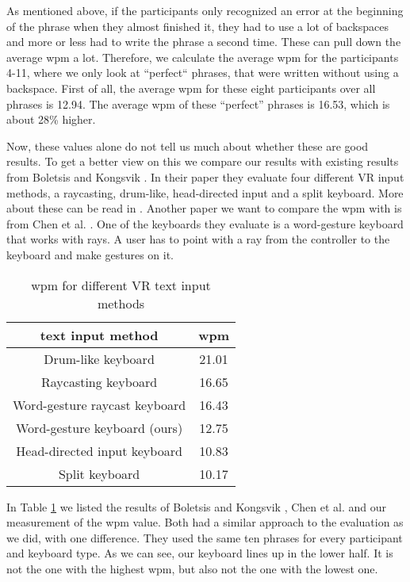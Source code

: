 As mentioned above, if the participants only recognized an error at the beginning of the phrase when they almost finished it, they had to use a lot of backspaces and more or less had to write the phrase a second time. These can pull down the average wpm a lot. Therefore, we calculate the average wpm for the participants 4-11, where we only look at ``perfect`` phrases, that were written without using a backspace. First of all, the average wpm for these eight participants over all phrases is 12.94. The average wpm of these ``perfect'' phrases is 16.53, which is about 28\% higher.

Now, these values alone do not tell us much about whether these are good results. To get a better view on this we compare our results with existing results from Boletsis and Kongsvik \cite{Boletsis2019ControllerbasedTT}. In their paper they evaluate four different VR input methods, a raycasting, drum-like, head-directed input and a split keyboard. More about these can be read in . Another paper we want to compare the wpm with is from Chen et al. \cite{10.1145/3290607.3312762}. One of the keyboards they evaluate is a word-gesture keyboard that works with rays. A user has to point with a ray from the controller to the keyboard and make gestures on it.
\begin{table}[ht!]
    \centering
    \caption{wpm for different VR text input methods}
    \begin{tabular}{cc} \toprule
        text input method&wpm\\ \midrule
        Drum-like keyboard& 21.01\\
        Raycasting keyboard& 16.65\\
        Word-gesture raycast keyboard& 16.43\\
        Word-gesture keyboard (ours)& 12.75\\
        Head-directed input keyboard& 10.83\\
        Split keyboard& 10.17\\
        \bottomrule
    \end{tabular}
    \label{tab:wpm_compare}
\end{table}

In Table \ref{tab:wpm_compare} we listed the results of Boletsis and Kongsvik \cite{Boletsis2019ControllerbasedTT}, Chen et al. \cite{10.1145/3290607.3312762} and our measurement of the wpm value. Both had a similar approach to the evaluation as we did, with one difference. They used the same ten phrases for every participant and keyboard type. As we can see, our keyboard lines up in the lower half. It is not the one with the highest wpm, but also not the one with the lowest one.\\

